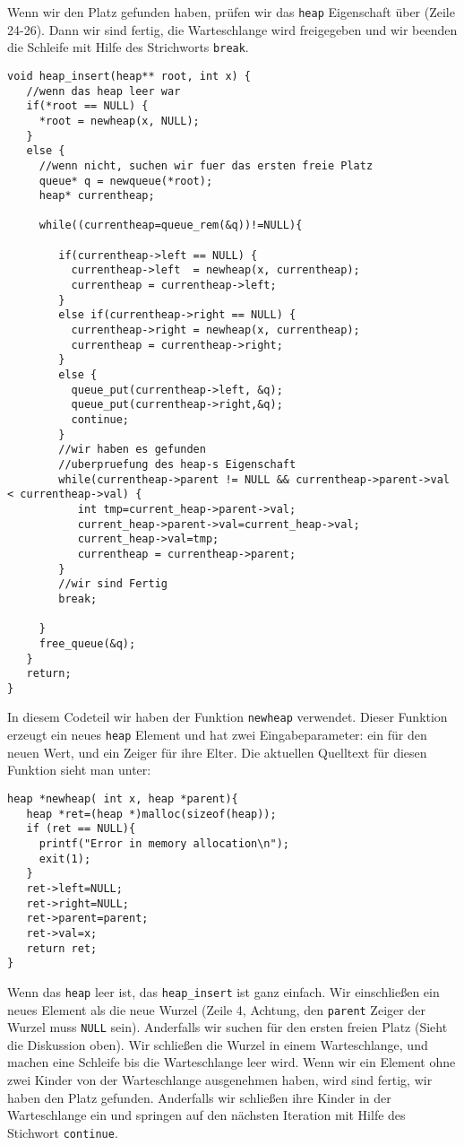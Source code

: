 Wenn wir den Platz gefunden haben, prüfen wir das \texttt{heap} Eigenschaft über
(Zeile 24-26). Dann wir sind fertig, die Warteschlange wird freigegeben und
wir beenden die Schleife mit Hilfe des Strichworts \texttt{break}.
\begin{lstlisting}
void heap_insert(heap** root, int x) {
   //wenn das heap leer war
   if(*root == NULL) {
     *root = newheap(x, NULL);
   }
   else {
     //wenn nicht, suchen wir fuer das ersten freie Platz
     queue* q = newqueue(*root);
     heap* currentheap;

     while((currentheap=queue_rem(&q))!=NULL){

        if(currentheap->left == NULL) {
          currentheap->left  = newheap(x, currentheap);
          currentheap = currentheap->left;
        }
        else if(currentheap->right == NULL) {
          currentheap->right = newheap(x, currentheap);
          currentheap = currentheap->right;
        }
        else {
          queue_put(currentheap->left, &q);
          queue_put(currentheap->right,&q);
          continue;
        }
        //wir haben es gefunden
        //uberpruefung des heap-s Eigenschaft
        while(currentheap->parent != NULL && currentheap->parent->val < currentheap->val) {
           int tmp=current_heap->parent->val;
           current_heap->parent->val=current_heap->val;
           current_heap->val=tmp;
           currentheap = currentheap->parent;
        }
        //wir sind Fertig
        break;
    
     }
     free_queue(&q);
   }
   return;
}
\end{lstlisting}
In diesem Codeteil wir haben der Funktion \texttt{newheap} verwendet. Dieser Funktion
erzeugt ein neues \texttt{heap} Element und hat zwei Eingabeparameter: ein für den neuen 
Wert, und ein Zeiger für ihre Elter. Die aktuellen Quelltext für diesen Funktion 
sieht man unter:
\begin{lstlisting}
heap *newheap( int x, heap *parent){
   heap *ret=(heap *)malloc(sizeof(heap));
   if (ret == NULL){
     printf("Error in memory allocation\n");
     exit(1);
   }
   ret->left=NULL;
   ret->right=NULL;
   ret->parent=parent;
   ret->val=x;
   return ret;
}
\end{lstlisting}
Wenn das \texttt{heap} leer ist, das \texttt{heap\_insert} ist ganz einfach. Wir einschließen ein neues 
Element als die neue Wurzel (Zeile 4, Achtung, den \texttt{parent} Zeiger der Wurzel muss \texttt{NULL} sein). 
Anderfalls wir suchen für den ersten freien Platz
(Sieht die Diskussion oben). Wir schließen die Wurzel in einem Warteschlange, und 
machen eine Schleife bis die Warteschlange leer wird. Wenn wir ein Element
ohne zwei Kinder von der Warteschlange ausgenehmen haben, wird sind fertig, wir
haben den Platz gefunden. Anderfalls wir schließen ihre Kinder in der Warteschlange
ein und springen auf den nächsten Iteration mit Hilfe des Stichwort \texttt{continue}.

